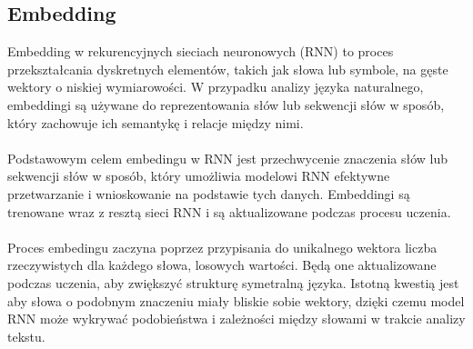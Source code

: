 \documentclass{article}
\begin{document}
    \subsection{Embedding}
    Embedding w rekurencyjnych sieciach neuronowych (RNN) to proces przekształcania dyskretnych elementów, takich jak słowa lub symbole, na gęste wektory o niskiej wymiarowości. W przypadku analizy języka naturalnego, embeddingi są używane do reprezentowania słów lub sekwencji słów w sposób, który zachowuje ich semantykę i relacje między nimi.\\\\
Podstawowym celem embedingu w RNN jest przechwycenie znaczenia słów lub sekwencji słów w sposób, który umożliwia modelowi RNN efektywne przetwarzanie i wnioskowanie na podstawie tych danych. Embeddingi są trenowane wraz z resztą sieci RNN i są aktualizowane podczas procesu uczenia. \\\\
Proces embedingu zaczyna poprzez przypisania do unikalnego wektora liczba rzeczywistych dla każdego słowa, losowych wartości. Będą one aktualizowane podczas uczenia, aby zwiększyć strukturę symetralną języka. Istotną kwestią jest aby słowa o podobnym znaczeniu miały bliskie sobie wektory, dzięki czemu model RNN może wykrywać podobieństwa i zależności między słowami w trakcie analizy tekstu.
\end{document}
